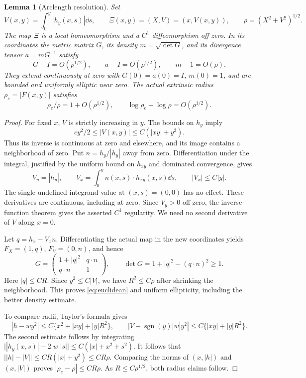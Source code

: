 \documentclass[11pt]{article}
\newtheorem{lemma}[theorem]{Lemma}
\theoremstyle{remark}\newtheorem{remark}[theorem]{Remark}
\begin{document}
\begin{lemma}[Arclength resolution]\label{lem:arclength}
Set
\[
 V(x,y)=\int_0^y |h_y(x,s)|\dd s,\qquad
 \Xi(x,y)=(X,V)=(x,V(x,y)),\qquad \rho=(X^2+V^2)^{1/2}.
\]
The map $\Xi$ is a local homeomorphism and a $C^1$ diffeomorphism off zero.
In its coordinates the metric matrix $G$, its density $m=\sqrt{\det G}$,
and its divergence tensor $a=mG^{-1}$ satisfy
\begin{equation}\label{eq:euclidean}
 G-I=O(\rho^{1/2}),\qquad a-I=O(\rho^{1/2}),\qquad m-1=O(\rho).
\end{equation}
They extend continuously at zero with $G(0)=a(0)=I$, $m(0)=1$, and are
bounded and uniformly elliptic near zero. The actual extrinsic radius
$\rho_e=|F(x,y)|$ satisfies
\begin{equation}\label{eq:radii}
 \rho_e/\rho=1+O(\rho^{1/2}),\qquad
 \log\rho_e-\log\rho=O(\rho^{1/2}).
\end{equation}
\end{lemma}
\begin{proof}
For fixed $x$, $V$ is strictly increasing in $y$. The bounds on $h_y$ imply
\[
 c y^2/2\leq |V(x,y)|\leq C(|xy|+y^2).
\]
Thus its inverse is continuous at zero and elsewhere, and its image contains
a neighborhood of zero. Put $n=h_y/|h_y|$ away from zero. Differentiation
under the integral, justified by the uniform bound on $h_{xy}$ and dominated
convergence, gives
\[
 V_y=|h_y|,\qquad V_x=\int_0^y n(x,s)\cdot h_{xy}(x,s)\dd s,
 \qquad |V_x|\leq C|y|.
\]
The single undefined integrand value at $(x,s)=(0,0)$ has no effect.
These derivatives are continuous, including at zero. Since $V_y>0$ off
zero, the inverse-function theorem gives the asserted $C^1$ regularity.
We need no second derivative of $V$ along $x=0$.

Let $q=h_x-V_xn$. Differentiating the actual map in the new coordinates yields
$F_X=(1,q)$, $F_V=(0,n)$, and hence
\[
 G=\begin{pmatrix}1+|q|^2&q\cdot n\\q\cdot n&1\end{pmatrix},\qquad
 \det G=1+|q|^2-(q\cdot n)^2\geq1.
\]
Here $|q|\leq CR$. Since $y^2\leq C|V|$, we have $R^2\leq C\rho$
after shrinking the neighborhood. This proves \eqref{eq:euclidean} and
uniform ellipticity, including the better density estimate.

To compare radii, Taylor's formula gives
\[
 |h-wy^2|\leq C\{x^2+|xy|+|y|R^2\},\qquad
 |V-\operatorname{sgn}(y)|w|y^2|
       \leq C\{|xy|+|y|R^2\}.
\]
The second estimate follows by integrating
$\bigl||h_y(x,s)|-2|w||s|\bigr|\leq C(|x|+x^2+s^2)$.
It follows that $\bigl||h|-|V|\bigr|\leq CR(|x|+y^2)\leq CR\rho$.
Comparing the norms of $(x,|h|)$ and $(x,|V|)$ proves
$|\rho_e-\rho|\leq CR\rho$. As $R\leq C\rho^{1/2}$, both radius
claims follow.
\end{proof}
\end{document}
